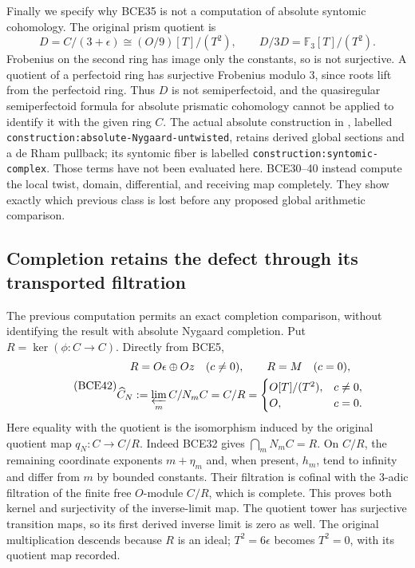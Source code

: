 Finally we specify why BCE35 is not a computation of
absolute syntomic cohomology. The original prism quotient is
\begin{equation}\tag{BCE41}
D=C/(3+\epsilon)\cong(O/9)[T]/(T^2),\qquad
D/3D=\mathbb F_3[T]/(T^2).
\end{equation}
Frobenius on the second ring has image only the constants,
so is not surjective. A quotient of a perfectoid ring has
surjective Frobenius modulo \(3\), since roots lift from
the perfectoid ring. Thus \(D\) is not semiperfectoid,
and the quasiregular semiperfectoid formula for absolute
prismatic cohomology cannot be applied to identify it with
the given ring \(C\).
The actual absolute construction in \cite{BL}, labelled
\texttt{construction:absolute-Nygaard-untwisted}, retains
derived global sections and a de Rham pullback; its syntomic
fiber is labelled \texttt{construction:syntomic-complex}.
Those terms have not been evaluated here. BCE30--40 instead
compute the local twist, domain, differential, and receiving
map completely. They show exactly which previous class is
lost before any proposed global arithmetic comparison.

\subsection{Completion retains the defect through its transported filtration}

The previous computation permits an exact completion comparison,
without identifying the result with absolute Nygaard completion.
Put \(R=\ker(\phi:C\to C)\). Directly from BCE5,
\begin{equation}\tag{BCE42}
\begin{gathered}
R=O\epsilon\oplus Oz\quad(c\ne0),\qquad R=M\quad(c=0),\\
\widehat C_N:=\varprojlim_m C/N_mC=C/R
=\begin{cases}O[T]/(T^2),&c\ne0,\\O,&c=0.\end{cases}
\end{gathered}
\end{equation}
Here equality with the quotient is the isomorphism induced by
the original quotient map \(q_N:C\to C/R\).
Indeed BCE32 gives \(\bigcap_mN_mC=R\). On \(C/R\),
the remaining coordinate exponents \(m+\eta_m\) and,
when present, \(h_m\), tend to infinity and differ from
\(m\) by bounded constants. Their filtration is cofinal
with the \(3\)-adic filtration of the finite free \(O\)-module
\(C/R\), which is complete. This proves both kernel and
surjectivity of the inverse-limit map. The quotient tower
has surjective transition maps, so its first derived
inverse limit is zero as well. The original multiplication
descends because \(R\) is an ideal; \(T^2=6\epsilon\)
becomes \(T^2=0\), with its quotient map recorded.

